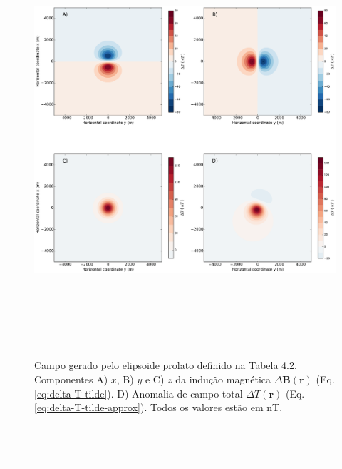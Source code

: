 \begin{figure}[hbt!]
	\centering \includegraphics[width=16cm,height=16cm]{figures/ellipsoid_prolate}
	\caption[Campo gerado pelo elipsoide prolato definido na Tabela 4.2. Componentes A) $x$, B) $y$ e C) $z$ da indução magnética $\Delta \mathbf{B}(\mathbf{r})$ (Eq. \ref{eq:delta-T-tilde}). D) Anomalia de campo total $\Delta T (\mathbf{r})$ (Eq. \ref{eq:delta-T-tilde-approx}). Todos os valores estão em nT.]{Campo gerado pelo elipsoide prolato definido na Tabela 4.2. Componentes A) $x$, B) $y$ e C) $z$ da indução magnética $\Delta \mathbf{B}(\mathbf{r})$ (Eq. \ref{eq:delta-T-tilde}). D) Anomalia de campo total $\Delta T (\mathbf{r})$ (Eq. \ref{eq:delta-T-tilde-approx}). Todos os valores estão em nT.}
	\label{fig:prolate}
\end{figure}

\begin{table}[h!]
	\begin{center}
		\begin{tabular}{lc}
			
			&  \\
			& \\
			& \\
			& \\
			& \\
			& \\ 
			& \\
			& \\
						& \\
						& \\
		\end{tabular}
	\end{center}
\end{table}

